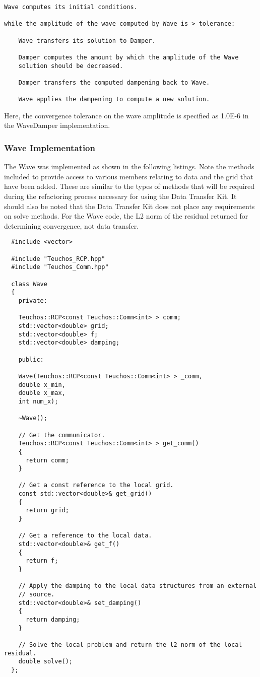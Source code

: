 \documentclass[letterpaper]{article}
\begin{document}
\begin{verbatim}
Wave computes its initial conditions.

while the amplitude of the wave computed by Wave is > tolerance:

    Wave transfers its solution to Damper.

    Damper computes the amount by which the amplitude of the Wave
    solution should be decreased.

    Damper transfers the computed dampening back to Wave.

    Wave applies the dampening to compute a new solution.
\end{verbatim}

Here, the convergence tolerance on the wave amplitude is specified as
1.0E-6 in the WaveDamper implementation.

\subsubsection{Wave Implementation}
The Wave was implemented as shown in the following listings. Note the
methods included to provide access to various members relating to data
and the grid that have been added. These are similar to the types of
methods that will be required during the refactoring process necessary
for using the Data Transfer Kit. It should also be noted that the
Data Transfer Kit does not place any requirements on solve methods. For
the Wave code, the L2 norm of the residual returned for determining
convergence, not data transfer.

\begin{lstlisting}
  #include <vector>

  #include "Teuchos_RCP.hpp"
  #include "Teuchos_Comm.hpp"

  class Wave
  {
    private:
    
    Teuchos::RCP<const Teuchos::Comm<int> > comm;
    std::vector<double> grid;
    std::vector<double> f;
    std::vector<double> damping;

    public:

    Wave(Teuchos::RCP<const Teuchos::Comm<int> > _comm,
    double x_min,
    double x_max,
    int num_x);

    ~Wave();

    // Get the communicator.
    Teuchos::RCP<const Teuchos::Comm<int> > get_comm()
    {
      return comm;
    }

    // Get a const reference to the local grid.
    const std::vector<double>& get_grid()
    {
      return grid;
    }

    // Get a reference to the local data.
    std::vector<double>& get_f()
    {
      return f;
    }

    // Apply the damping to the local data structures from an external
    // source. 
    std::vector<double>& set_damping()
    {
      return damping;
    }

    // Solve the local problem and return the l2 norm of the local residual.
    double solve();
  };
\end{lstlisting}
\end{document}
